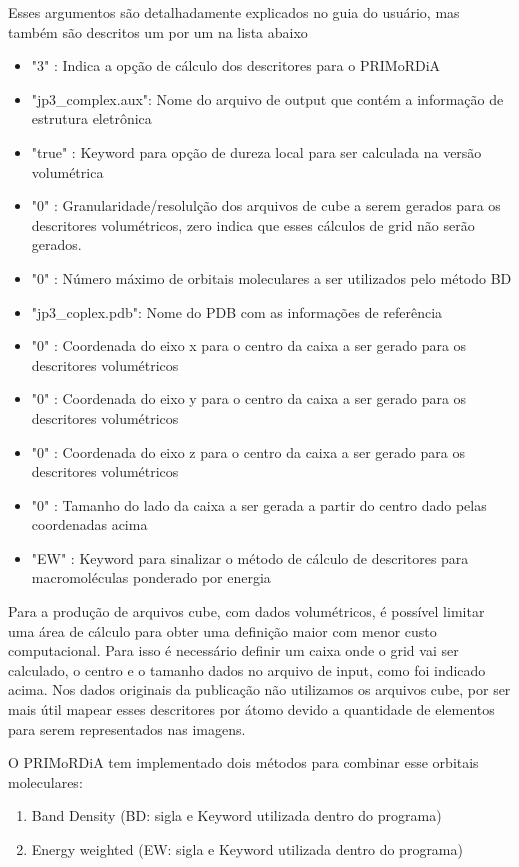 \documentclass[a4paper,11pt]{refart}
\begin{document}
	Esses argumentos são detalhadamente explicados no guia do usuário, mas também são descritos um por um na lista abaixo
	
	\begin{itemize}
		\item "3" : Indica a opção de cálculo dos descritores para o PRIMoRDiA
		\item "jp3\_complex.aux": Nome do arquivo de output que contém a informação de estrutura eletrônica
		\item "true" : Keyword para opção de dureza local para ser calculada na versão volumétrica
		\item "0" : Granularidade/resolulção dos arquivos de cube a serem gerados para os descritores volumétricos, zero indica que esses cálculos de grid não serão gerados.
		\item "0" : Número máximo de orbitais moleculares a ser utilizados pelo método BD
		\item "jp3\_coplex.pdb": Nome do PDB com as informações de referência
		\item "0" : Coordenada do eixo x para o centro da caixa a ser gerado para os descritores volumétricos
		\item "0" : Coordenada do eixo y para o centro da caixa a ser gerado para os descritores volumétricos
		\item "0" : Coordenada do eixo z para o centro da caixa a ser gerado para os descritores volumétricos
		\item "0" : Tamanho do lado da caixa a ser gerada a partir do centro dado pelas coordenadas acima
		\item "EW" : Keyword para sinalizar o método de cálculo de descritores para macromoléculas ponderado por energia
	\end{itemize}
	
	Para a produção de arquivos cube, com dados volumétricos, é possível limitar uma área de cálculo para obter uma definição maior com menor custo computacional. Para isso é necessário definir um caixa onde o grid vai ser calculado, o centro e o tamanho dados no arquivo de input, como foi indicado acima. Nos dados originais da publicação não utilizamos os arquivos cube, por ser mais útil mapear esses descritores por átomo devido a quantidade de elementos para serem representados nas imagens.  
	
	O PRIMoRDiA tem implementado dois métodos para combinar esse orbitais moleculares:
	
	\begin{enumerate}
		\item Band Density (BD: sigla e Keyword utilizada dentro do programa)
		\item Energy weighted (EW: sigla e Keyword utilizada dentro do programa)
	\end{enumerate}
	
\end{document}
